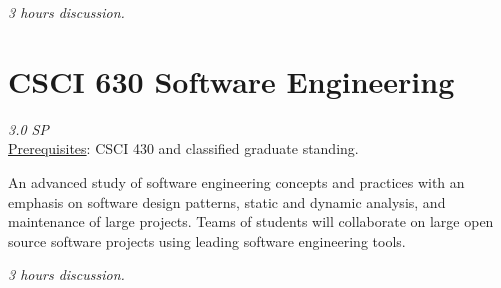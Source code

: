 \documentclass[12pt]{article}
\begin{document}
  \textit{3 hours discussion.}

  \section*{CSCI 630 Software Engineering}
  \textit{3.0 SP} \\
  \underline{Prerequisites}: CSCI 430 and classified graduate standing.

   An advanced study of software engineering concepts and practices with an emphasis on software design patterns, static and dynamic analysis, and maintenance of large projects. Teams of students will collaborate on large open source software projects using leading software engineering tools. 

   \textit{3 hours discussion.}
  
\end{document}
